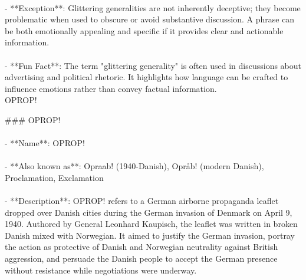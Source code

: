 \documentclass[a4paper,12pt,single,pdftex]{scrbook}
\begin{document}
    
      
    \\

    
      - **Exception**: Glittering generalities are not inherently deceptive; they become problematic when used to obscure or avoid substantive discussion. A phrase can be both emotionally appealing and specific if it provides clear and actionable information.
    \\

    
      
    \\

    
      - **Fun Fact**: The term "glittering generality" is often used in discussions about advertising and political rhetoric. It highlights how language can be crafted to influence emotions rather than convey factual information.
    \\

  

OPROP!
    
      \#\#\# OPROP!
    \\

    
      
    \\

    
      - **Name**: OPROP!
    \\

    
      
    \\

    
      - **Also known as**: Opraab! (1940-Danish), Opråb! (modern Danish), Proclamation, Exclamation
    \\

    
      
    \\

    
      - **Description**: OPROP! refers to a German airborne propaganda leaflet dropped over Danish cities during the German invasion of Denmark on April 9, 1940. Authored by General Leonhard Kaupisch, the leaflet was written in broken Danish mixed with Norwegian. It aimed to justify the German invasion, portray the action as protective of Danish and Norwegian neutrality against British aggression, and persuade the Danish people to accept the German presence without resistance while negotiations were underway.
    \\

    
      
    \\
\end{document}
